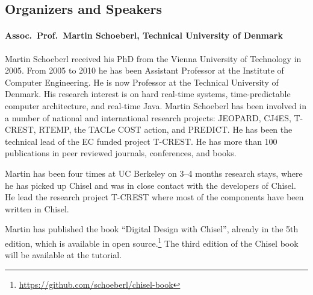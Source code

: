 \documentclass{article}
\begin{document}
\subsection*{Organizers and Speakers}

 
\paragraph{Assoc.~Prof.~Martin Schoeberl, Technical University of Denmark}

Martin Schoeberl received his PhD from the Vienna University of Technology in 2005. From 2005 to 2010 he has been Assistant Professor at the Institute of Computer Engineering. He is now Professor at the Technical University of Denmark. His research interest is on hard real-time systems, time-predictable computer architecture, and real-time Java.  Martin Schoeberl has been involved in a number of national and international research projects: JEOPARD, CJ4ES, T-CREST, RTEMP, the TACLe COST action, and PREDICT.  He has been the technical lead of the EC funded project T-CREST.  He has more than 100 publications in peer reviewed journals, conferences, and books.

Martin has been four times at UC Berkeley on 3--4 months research stays, where he has picked up Chisel and was in close contact with the developers of Chisel. He lead the research project T-CREST where most of the components have been written in Chisel.

Martin has published the book ``Digital Design with Chisel'', already in the 5th edition,
which is available in open source.\footnote{\url{https://github.com/schoeberl/chisel-book}}
The third edition of the Chisel book will be available at the tutorial.

%
%
\end{document}
